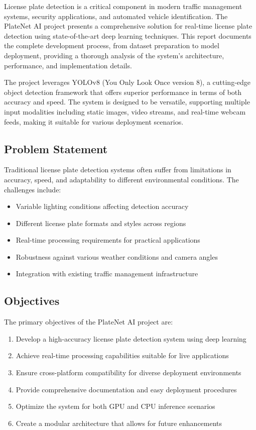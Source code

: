 \documentclass[12pt,a4paper]{article}
\begin{document}
License plate detection is a critical component in modern traffic management systems, security applications, and automated vehicle identification. The PlateNet AI project presents a comprehensive solution for real-time license plate detection using state-of-the-art deep learning techniques. This report documents the complete development process, from dataset preparation to model deployment, providing a thorough analysis of the system's architecture, performance, and implementation details.

The project leverages YOLOv8 (You Only Look Once version 8), a cutting-edge object detection framework that offers superior performance in terms of both accuracy and speed. The system is designed to be versatile, supporting multiple input modalities including static images, video streams, and real-time webcam feeds, making it suitable for various deployment scenarios.

\subsection{Problem Statement}

Traditional license plate detection systems often suffer from limitations in accuracy, speed, and adaptability to different environmental conditions. The challenges include:

\begin{itemize}
    \item Variable lighting conditions affecting detection accuracy
    \item Different license plate formats and styles across regions
    \item Real-time processing requirements for practical applications
    \item Robustness against various weather conditions and camera angles
    \item Integration with existing traffic management infrastructure
\end{itemize}

\subsection{Objectives}

The primary objectives of the PlateNet AI project are:

\begin{enumerate}
    \item Develop a high-accuracy license plate detection system using deep learning
    \item Achieve real-time processing capabilities suitable for live applications
    \item Ensure cross-platform compatibility for diverse deployment environments
    \item Provide comprehensive documentation and easy deployment procedures
    \item Optimize the system for both GPU and CPU inference scenarios
    \item Create a modular architecture that allows for future enhancements
\end{enumerate}
\end{document}
